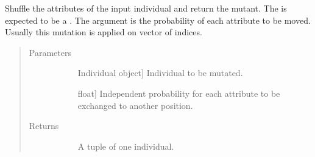 \documentclass[letterpaper,10pt,english]{sphinxmanual}
\begin{document}

\begin{fulllineitems}
\label{\detokenize{pygace:pygace.ga.gaceMutShuffleIndexes}}
Shuffle the attributes of the input individual and return the mutant.
The  is expected to be a . The  argument
is the probability of each attribute to be moved. Usually this mutation is
applied on vector of indices.
\begin{quote}\begin{description}
\item[{Parameters}] \leavevmode\begin{description}
\item[{}] \leavevmode{[}Individual object{]}
Individual to be mutated.

\item[{}] \leavevmode{[}float{]}
Independent probability for each attribute to be exchanged to another
position.

\end{description}

\item[{Returns}] \leavevmode\begin{description}
\item[{}] \leavevmode
A tuple of one individual.

\end{description}

\end{description}\end{quote}

\end{fulllineitems}

\end{document}

